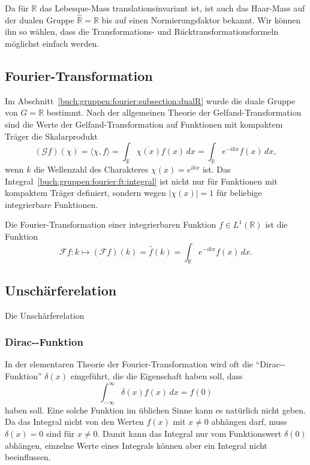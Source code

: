 Da für $\mathbb{R}$ das Lebesque-Mass translationsinvariant ist,
ist auch das Haar-Mass auf der dualen Gruppe $\hat{\mathbb{R}}=\mathbb{R}$
bis auf einen Normierungsfaktor bekannt.
Wir können ihn so wählen, dass die Transformations- und
Rücktransformationsformeln möglichst einfach werden.

%
%
\subsection{Fourier-Transformation
\label{buch:gruppen:fourier:subsection:transformation}}
Im Abschnitt~\ref{buch:gruppen:fourier:subsection:dualR} wurde die
duale Gruppe von $G=\mathbb{R}$ bestimmt.
Nach der allgemeinen Theorie der Gelfand-Transformation sind die
Werte der Gelfand-Transformation auf Funktionen mit kompaktem
Träger die Skalarprodukt
\begin{equation}
(\mathscr{G}f)(\chi)
=
\langle \chi,f\rangle
=
\int_{\mathbb{R}} \overline{\chi(x)} f(x)\,dx
=
\int_{\mathbb{R}} e^{-ikx} f(x)\,dx,
\label{buch:gruppen:fourier:ft:integral}
\end{equation}
wenn $k$ die Wellenzahl des Charakteres $\chi(x)=e^{ikx}$ ist.
Das Integral~\eqref{buch:gruppen:fourier:ft:integral} ist nicht nur
für Funktionen mit kompaktem Träger definiert, sondern wegen $|\chi(x)|=1$
für beliebige integrierbare Funktionen.

\begin{definition}
Die Fourier-Transformation einer integrierbaren Funktion $f\in L^1(\mathbb{R})$
%
ist die Funktion
\[
\mathscr{F}f
\colon
k\mapsto
(\mathscr{F}f)(k)
=
\hat{f}(k)
=
\int_{\mathbb{R}} e^{-ikx}f(x)\,dx.
\]
\end{definition}

%
%
\subsection{Unschärferelation
\label{buch:gruppen:fourier:subsection:unschaerfe}}
Die Unschärferelation 

%
%
\subsubsection{Dirac-\textdelta-Funktion}
In der elementaren Theorie der Fourier-Transformation wird oft 
die ``Dirac-\textdelta-Funktion'' $\delta(x)$ eingeführt, die die
Eigenschaft haben soll, dass
\begin{equation}
\int_{-\infty}^\infty \delta(x) f(x)\,dx = f(0)
\label{buch:gruppen:fourier:eqn:deltadef}
\end{equation}
haben soll.
Eine solche Funktion im üblichen Sinne kann es natürlich nicht geben.
Da das Integral nicht von den Werten $f(x)$ mit $x\ne 0$ abhängen darf,
muss $\delta(x)=0$ sind für $x\ne 0$.
Damit kann das Integral nur vom Funktionswert $\delta(0)$ abhängen,
einzelne Werte eines Integrals können aber ein Integral nicht beeinflussen.

